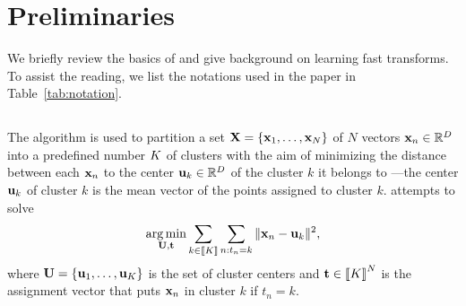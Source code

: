 \section{Preliminaries}
\label{sec:background}
We briefly review the basics of \kmeans and
 give background on learning fast transforms.
  To  assist  the  reading,  we  list  the notations used in the paper in Table~\ref{tab:notation}.









\subsection{\kmeans}
\label{sec:kmeans}
The \kmeans algorithm is used to partition a set ${\mathbf{X}}=\{{\mathbf{x}}_1,\ldots,{\mathbf{x}}_N\}$ of $N$  vectors ${\mathbf{x}}_n\in\mathbb{R}^{D}$ into a predefined number $K$ of clusters
with the aim of minimizing the distance between each ${\mathbf{x}}_n$ to the center ${\mathbf{u}}_k\in\mathbb{R}^{D}$
of the cluster $k$ it belongs to ---the center ${\mathbf{u}}_k$ of cluster $k$ is the
 mean vector of the points assigned to cluster $k$.
\kmeans attempts to solve
\begin{equation}
\label{eq:kmean_problem}
    \operatorname*{arg\,min}_{{\mathbf{U}}, {\mathbf{t}}} \sum_{k\in\left \llbracket K\right \rrbracket} \sum_{n: t_n = k} \|{\mathbf{x}}_{n} -{\mathbf{u}}_{k}\|^2,
\end{equation}
where ${\mathbf{U}}=\{{\mathbf{u}}_1,\ldots,{\mathbf{u}}_K\}$ is the set of cluster centers and ${\mathbf{t}} \in  \left \llbracket K\right \rrbracket^{N}$ is the assignment vector that puts ${\mathbf{x}}_n$ in cluster $k$
if $t_n=k$.


